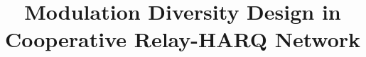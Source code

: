 \documentclass[journal]{IEEEtran}
\begin{document}
%
\title{Modulation Diversity Design in Cooperative Relay-HARQ Network}


\author{
}


% 
\end{document}
